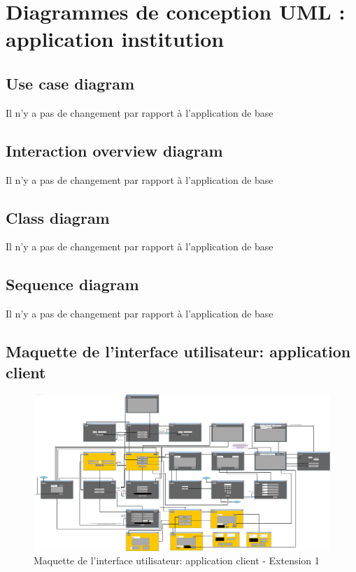 \documentclass[]{report}
\begin{document}


\newpage



\section{Diagrammes de conception UML : application institution}



\subsection{Use case diagram}

Il n'y a pas de changement par rapport à l'application de base


\subsection{Interaction overview diagram}

Il n'y a pas de changement par rapport à l'application de base

\subsection{Class diagram}

Il n'y a pas de changement par rapport à l'application de base

\subsection{Sequence diagram}

Il n'y a pas de changement par rapport à l'application de base

\newpage

\subsection{Maquette de l'interface utilisateur: application client}

\begin{figure}[h]
	\centering\includegraphics[width=\linewidth]{img/UI-client-Extension-1.pdf}
	\caption{Maquette de l'interface utilisateur: application client - Extension 1}
\end{figure}
\end{document}
